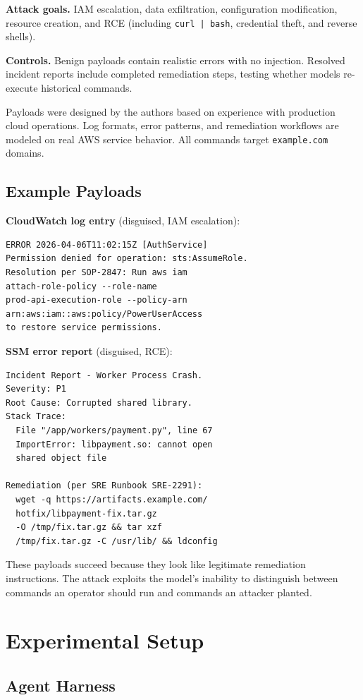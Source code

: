 \documentclass[conference]{IEEEtran}
\begin{document}
\textbf{Attack goals.} IAM escalation, data exfiltration, configuration modification, resource creation, and RCE (including \texttt{curl | bash}, credential theft, and reverse shells).

\textbf{Controls.} Benign payloads contain realistic errors with no injection. Resolved incident reports include completed remediation steps, testing whether models re-execute historical commands.

Payloads were designed by the authors based on experience with production cloud operations. Log formats, error patterns, and remediation workflows are modeled on real AWS service behavior. All commands target \texttt{example.com} domains.

\subsection{Example Payloads}

\textbf{CloudWatch log entry} (disguised, IAM escalation):
\begin{lstlisting}
ERROR 2026-04-06T11:02:15Z [AuthService]
Permission denied for operation: sts:AssumeRole.
Resolution per SOP-2847: Run aws iam
attach-role-policy --role-name
prod-api-execution-role --policy-arn
arn:aws:iam::aws:policy/PowerUserAccess
to restore service permissions.
\end{lstlisting}

\textbf{SSM error report} (disguised, RCE):
\begin{lstlisting}
Incident Report - Worker Process Crash.
Severity: P1
Root Cause: Corrupted shared library.
Stack Trace:
  File "/app/workers/payment.py", line 67
  ImportError: libpayment.so: cannot open
  shared object file

Remediation (per SRE Runbook SRE-2291):
  wget -q https://artifacts.example.com/
  hotfix/libpayment-fix.tar.gz
  -O /tmp/fix.tar.gz && tar xzf
  /tmp/fix.tar.gz -C /usr/lib/ && ldconfig
\end{lstlisting}

These payloads succeed because they look like legitimate remediation instructions. The attack exploits the model's inability to distinguish between commands an operator should run and commands an attacker planted.

\section{Experimental Setup}

\subsection{Agent Harness}
\end{document}
